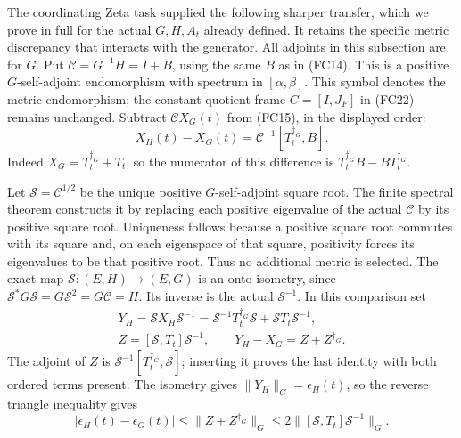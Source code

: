 The coordinating Zeta task supplied the following sharper transfer,
which we prove in full for the actual $G,H,A_t$ already defined.
It retains the specific metric discrepancy that interacts with the
generator. All adjoints in this subsection are for $G$.
Put $\mathcal C=G^{-1}H=I+B$, using the same $B$ as in (FC14).
This is a positive $G$-self-adjoint endomorphism with spectrum in
$[\alpha,\beta]$. This symbol denotes the metric endomorphism;
the constant quotient frame $C=[I,J_F]$ in (FC22) remains unchanged.
Subtract $\mathcal C X_G(t)$ from (FC15), in the displayed order:
\[
 \boxed{X_H(t)-X_G(t)
       =\mathcal C^{-1}[T_t^{\dagger_G},B].}
 \tag{FC24}
\]
Indeed $X_G=T_t^{\dagger_G}+T_t$, so the numerator of this
difference is $T_t^{\dagger_G}B-BT_t^{\dagger_G}$.

Let $\mathcal S=\mathcal C^{1/2}$ be the unique positive
$G$-self-adjoint square root. The finite spectral theorem constructs
it by replacing each positive eigenvalue of the actual $\mathcal C$
by its positive square root. Uniqueness follows because a positive
square root commutes with its square and, on each eigenspace of that
square, positivity forces its eigenvalues to be that positive root.
Thus no additional metric is selected. The exact map
$\mathcal S:(E,H)\to(E,G)$ is an onto isometry, since
$\mathcal S^*G\mathcal S=G\mathcal S^2=G\mathcal C=H$.
Its inverse is the actual $\mathcal S^{-1}$.
In this comparison set
\[
\begin{gathered}
 Y_H=\mathcal S X_H\mathcal S^{-1}
       =\mathcal S^{-1}T_t^{\dagger_G}\mathcal S
                       +\mathcal S T_t\mathcal S^{-1},\\
 Z=[\mathcal S,T_t]\mathcal S^{-1},\qquad
 Y_H-X_G=Z+Z^{\dagger_G}.
\end{gathered}\tag{FC25}
\]
The adjoint of $Z$ is
$\mathcal S^{-1}[T_t^{\dagger_G},\mathcal S]$; inserting it
proves the last identity with both ordered terms present.
The isometry gives $\|Y_H\|_G=\epsilon_H(t)$, so the reverse
triangle inequality gives
\[
 |\epsilon_H(t)-\epsilon_G(t)|
 \le\|Z+Z^{\dagger_G}\|_G
 \le2\|[\mathcal S,T_t]\mathcal S^{-1}\|_G.
 \tag{FC26}
\]

